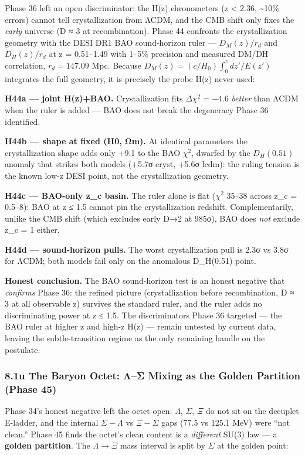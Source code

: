 \documentclass[
]{article}
\begin{document}
Phase 36 left an open discriminator: the H(z) chronometers (z
\textless{} 2.36, \textasciitilde10\% errors) cannot tell
crystallization from ΛCDM, and the CMB shift only fixes the \emph{early}
universe (D ≈ 3 at recombination). Phase 44 confronts the
crystallization geometry with the DESI DR1 BAO sound-horizon ruler ---
\(D_M(z)/r_d\) and \(D_H(z)/r_d\) at z = 0.51--1.49 with 1--5\%
precision and measured DM/DH correlation, \(r_d = 147.09\) Mpc. Because
\(D_M(z) = (c/H_0)\int_0^z dz'/E(z')\) integrates the full geometry, it
is precisely the probe H(z) never used:

\textbf{H44a --- joint H(z)+BAO.} Crystallization fits
\(\Delta\chi^2 = -4.6\) \emph{better} than ΛCDM when the ruler is added
--- BAO does not break the degeneracy Phase 36 identified.

\textbf{H44b --- shape at fixed (H0, Ωm).} At identical parameters the
crystallization shape adds only +9.1 to the BAO \(\chi^2\), dwarfed by
the \(D_H(0.51)\) anomaly that strikes both models (+5.7σ cryst, +5.6σ
lcdm): the ruling tension is the known low-z DESI point, not the
crystallization geometry.

\textbf{H44c --- BAO-only z\_c basin.} The ruler alone is flat
(\(\chi^2\) 35--38 across z\_c = 0.5--8): BAO at z ≤ 1.5 cannot pin the
crystallization redshift. Complementarily, unlike the CMB shift (which
excludes early D→2 at 985σ), BAO does \emph{not} exclude z\_c = 1
either.

\textbf{H44d --- sound-horizon pulls.} The worst crystallization pull is
2.3σ vs 3.8σ for ΛCDM; both models fail only on the anomalous D\_H(0.51)
point.

\textbf{Honest conclusion.} The BAO sound-horizon test is an honest
negative that \emph{confirms} Phase 36: the refined picture
(crystallization before recombination, D ≈ 3 at all observable z)
survives the standard ruler, and the ruler adds no discriminating power
at z ≤ 1.5. The discriminators Phase 36 targeted --- the BAO ruler at
higher z and high-z H(z) --- remain untested by current data, leaving
the subtle-transition regime as the only remaining handle on the
postulate.

\subsubsection{8.1u The Baryon Octet: Λ--Σ Mixing as the Golden
Partition (Phase
45)}\label{u-the-baryon-octet-ux3bbux3c3-mixing-as-the-golden-partition-phase-45}

Phase 34's honest negative left the octet open: \(\Lambda\), \(\Sigma\),
\(\Xi\) do not sit on the decuplet E-ladder, and the internal
\(\Sigma{-}\Lambda\) vs \(\Xi{-}\Sigma\) gaps (77.5 vs 125.1 MeV) were
``not clean.'' Phase 45 finds the octet's clean content is a
\emph{different} SU(3) law --- a \textbf{golden partition}. The
\(\Lambda \to \Xi\) mass interval is split by \(\Sigma\) at the golden
point:
\end{document}
